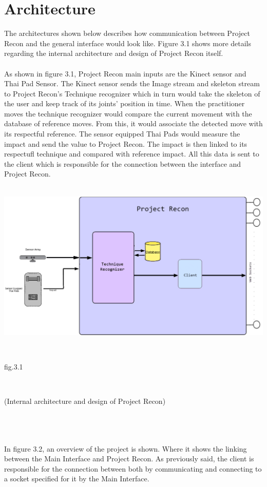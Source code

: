 \documentclass[11pt]{article} %
\begin{document}
\section{Architecture}
The architectures shown below describes how communication between Project Recon and the general interface would look like. Figure 3.1 shows more details regarding the internal architecture and design of Project Recon itself.
\\
\\
As shown in figure 3.1, Project Recon main inputs are the Kinect sensor and Thai Pad Sensor. The Kinect sensor sends the Image stream and skeleton stream to Project Recon's Technique recognizer which in turn would take the skeleton of the user and keep track of its joints' position in time. When the practitioner moves the technique recognizer would compare the current movement with the database of reference moves. From this, it would associate the detected move with its respectful  reference. The sensor equipped Thai Pads would measure the impact and send the value to Project Recon. The impact is then linked to its respectufl technique and compared with reference impact. All this data is sent to the client which is responsible for the connection between the interface and Project Recon.
\\
\\
\centerline{\includegraphics[scale=0.4]{project_Recon_diagram.png}}
\\
\centerline{fig.3.1}
\\
\centerline{(Internal architecture and design of Project Recon)}
\\
\\
\\
In figure 3.2, an overview of the project is shown. Where it shows the linking between the Main Interface and Project Recon. As previously said, the client is responsible for the connection between both by communicating and connecting to a socket specified for it by the Main Interface.
\end{document}
